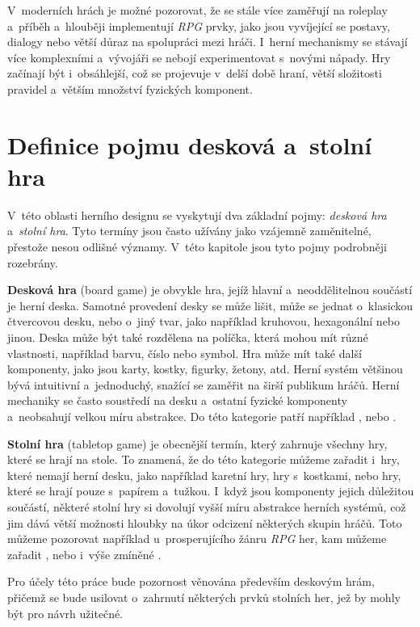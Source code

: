 V~moderních hrách je možné pozorovat, že se stále více zaměřují na roleplay a~příběh a~hlouběji implementují \textit{RPG} prvky, jako jsou vyvíjející se postavy, dialogy nebo větší důraz na spolupráci mezi hráči. I~herní mechanismy se stávají více komplexními a~vývojáři se nebojí experimentovat s~novými nápady. Hry začínají být i~obsáhlejší, což se projevuje v~delší době hraní, větší složitosti pravidel a~větším množství fyzických komponent.


\section{Definice pojmu desková a~stolní hra}
\label{subsec:boardgame_definition}

V~této oblasti herního designu se vyskytují dva základní pojmy: \textit{desková hra} a~\textit{stolní hra}. Tyto termíny jsou často užívány jako vzájemně zaměnitelné, přestože nesou odlišné významy. V~této kapitole jsou tyto pojmy podrobněji rozebrány.

\textbf{Desková hra} (board game) je obvykle hra, jejíž hlavní a~neoddělitelnou součástí je herní deska. Samotné provedení desky se může lišit, může se jednat o~klasickou čtvercovou desku, nebo o~jiný tvar, jako například kruhovou, hexagonální nebo jinou. Deska může být také rozdělena na políčka, která mohou mít různé vlastnosti, například barvu, číslo nebo symbol. Hra může mít také další komponenty, jako jsou karty, kostky, figurky, žetony, atd. Herní systém většinou bývá intuitivní a~jednoduchý, snažící se zaměřit na širší publikum hráčů. Herní mechaniky se často soustředí na desku a~ostatní fyzické komponenty a~neobsahují velkou míru abstrakce. Do této kategorie patří například ,  nebo . \cite{board_game_supply_2023}

\textbf{Stolní hra} (tabletop game) je obecnější termín, který zahrnuje všechny hry, které se hrají na stole. To znamená, že do této kategorie můžeme zařadit i~hry, které nemají herní desku, jako například karetní hry, hry s~kostkami, nebo hry, které se hrají pouze s~papírem a~tužkou. I~když jsou komponenty jejich důležitou součástí, některé stolní hry si dovolují vyšší míru abstrakce herních systémů, což jim dává větší možnosti hloubky na úkor odcizení některých skupin hráčů. Toto můžeme pozorovat například u~prosperujícího žánru \textit{RPG} her, kam můžeme zařadit ,  nebo i~výše zmíněné . \cite{board_game_supply_2023}

Pro účely této práce bude pozornost věnována především deskovým hrám, přičemž se bude usilovat o~zahrnutí některých prvků stolních her, jež by mohly být pro návrh užitečné.
